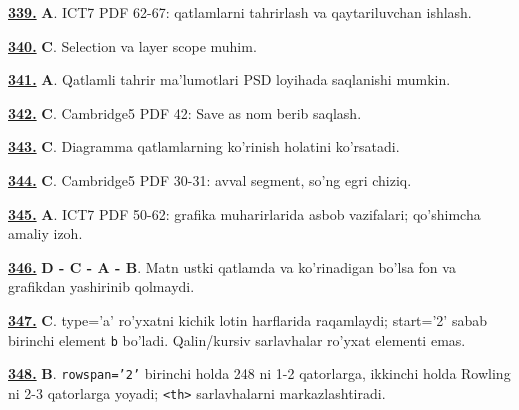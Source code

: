 \documentclass[10pt,a4paper,oneside]{article}
\begin{document}
\par\vspace{3mm}
\noindent\hyperlink{q339}{\textbf{339.}} \textbf{A}.  ICT7 PDF 62-67: qatlamlarni tahrirlash va qaytariluvchan ishlash.
\par\vspace{3mm}
\noindent\hyperlink{q340}{\textbf{340.}} \textbf{C}.  Selection va layer scope muhim.
\par\vspace{3mm}
\noindent\hyperlink{q341}{\textbf{341.}} \textbf{A}.  Qatlamli tahrir ma'lumotlari PSD loyihada saqlanishi mumkin.
\par\vspace{3mm}
\noindent\hyperlink{q342}{\textbf{342.}} \textbf{C}.  Cambridge5 PDF 42: Save as nom berib saqlash.
\par\vspace{3mm}
\noindent\hyperlink{q343}{\textbf{343.}} \textbf{C}.  Diagramma qatlamlarning ko'rinish holatini ko'rsatadi.
\par\vspace{3mm}
\noindent\hyperlink{q344}{\textbf{344.}} \textbf{C}.  Cambridge5 PDF 30-31: avval segment, so'ng egri chiziq.
\par\vspace{3mm}
\noindent\hyperlink{q345}{\textbf{345.}} \textbf{A}.  ICT7 PDF 50-62: grafika muharirlarida asbob vazifalari; qo'shimcha amaliy izoh.
\par\vspace{3mm}
\noindent\hyperlink{q346}{\textbf{346.}} \textbf{D - C - A - B}.  Matn ustki qatlamda va ko'rinadigan bo'lsa fon va grafikdan yashirinib qolmaydi.
\par\vspace{3mm}
\noindent\hyperlink{q347}{\textbf{347.}} \textbf{C}.  type='a' ro'yxatni kichik lotin harflarida raqamlaydi; start='2' sabab birinchi element \texttt{b} bo'ladi. Qalin/kursiv sarlavhalar ro'yxat elementi emas.
\par\vspace{3mm}
\noindent\hyperlink{q348}{\textbf{348.}} \textbf{B}.  \texttt{rowspan='2'} birinchi holda 248 ni 1-2 qatorlarga, ikkinchi holda Rowling ni 2-3 qatorlarga yoyadi; \texttt{\textless{}th\textgreater{}} sarlavhalarni markazlashtiradi.
\end{document}
